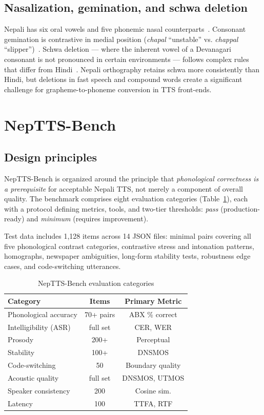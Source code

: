 \documentclass{Interspeech}
\begin{document}
\subsection{Nasalization, gemination, and schwa deletion}

Nepali has six oral vowels and five phonemic nasal counterparts~\cite{Khatiwada2009, Bandhu1971}. Consonant gemination is contrastive in medial position (\textit{chapal} ``unstable'' vs. \textit{chappal} ``slipper'')~\cite{Khatiwada2009}. Schwa deletion --- where the inherent vowel of a Devanagari consonant is not pronounced in certain environments --- follows complex rules that differ from Hindi~\cite{Choudhury2004}. Nepali orthography retains schwa more consistently than Hindi, but deletions in fast speech and compound words create a significant challenge for grapheme-to-phoneme conversion in TTS front-ends.

\section{NepTTS-Bench}

\subsection{Design principles}

NepTTS-Bench is organized around the principle that \textit{phonological correctness is a prerequisite} for acceptable Nepali TTS, not merely a component of overall quality. The benchmark comprises eight evaluation categories (Table~\ref{tab:categories}), each with a protocol defining metrics, tools, and two-tier thresholds: \textit{pass} (production-ready) and \textit{minimum} (requires improvement).

Test data includes 1,128 items across 14 JSON files: minimal pairs covering all five phonological contrast categories, contrastive stress and intonation patterns, homographs, newspaper ambiguities, long-form stability tests, robustness edge cases, and code-switching utterances.

\begin{table}[t]
  \caption{NepTTS-Bench evaluation categories}
  \label{tab:categories}
  \centering
  \small
  \begin{tabular}{lcc}
    \toprule
    \textbf{Category} & \textbf{Items} & \textbf{Primary Metric} \\
    \midrule
    Phonological accuracy & 70+ pairs & ABX \% correct \\
    Intelligibility (ASR) & full set & CER, WER \\
    Prosody & 200+ & Perceptual \\
    Stability & 100+ & DNSMOS \\
    Code-switching & 50 & Boundary quality \\
    Acoustic quality & full set & DNSMOS, UTMOS \\
    Speaker consistency & 200 & Cosine sim. \\
    Latency & 100 & TTFA, RTF \\
    \bottomrule
  \end{tabular}
\end{table}
\end{document}
